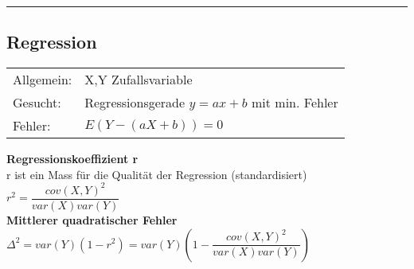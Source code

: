 \hrule

\vspace{2mm}
	\begin{minipage}[]{9cm}
	\subsection{Regression  }
		\begin{tabular}{ll}
        Allgemein: & X,Y Zufallsvariable\\
        Gesucht: & Regressionsgerade $y=ax+b$ mit min. Fehler\\
        Fehler: & $E(Y-(aX+b))=0$
        \end{tabular}
		\vspace{.1cm}

		\textbf{Regressionskoeffizient r}\\
        r ist ein Mass für die Qualität der Regression (standardisiert)\\
        $r^2=\dfrac{cov(X,Y)^2}{var(X)var(Y)}$ \\
        
		\textbf{Mittlerer quadratischer Fehler}\\
        $ \Delta^2 = var(Y)(1-r^2) =
        var(Y)\left(1-\dfrac{cov(X,Y)^2}{var(X)var(Y)}\right) $ \\
	\end{minipage}
